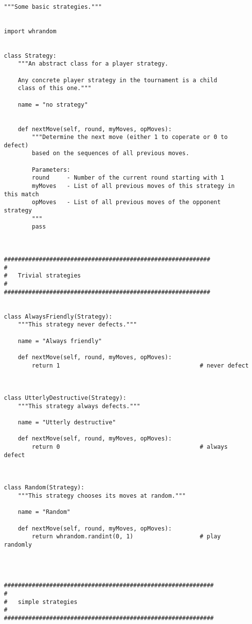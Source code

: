 \documentclass[12pt,a4paper,ngerman]{article}
\begin{document}
\begin{scriptsize}
\begin{verbatim}

"""Some basic strategies."""


import whrandom


class Strategy:
    """An abstract class for a player strategy.

    Any concrete player strategy in the tournament is a child
    class of this one."""

    name = "no strategy"


    def nextMove(self, round, myMoves, opMoves):
        """Determine the next move (either 1 to coperate or 0 to defect)
        based on the sequences of all previous moves.

        Parameters:
        round     - Number of the current round starting with 1
        myMoves   - List of all previous moves of this strategy in this match
        opMoves   - List of all previous moves of the opponent strategy
        """
        pass



###########################################################
#
#   Trivial strategies
#
###########################################################


class AlwaysFriendly(Strategy):
    """This strategy never defects."""

    name = "Always friendly"

    def nextMove(self, round, myMoves, opMoves):
        return 1                                        # never defect



class UtterlyDestructive(Strategy):
    """This strategy always defects."""

    name = "Utterly destructive"

    def nextMove(self, round, myMoves, opMoves):
        return 0                                        # always defect



class Random(Strategy):
    """This strategy chooses its moves at random."""

    name = "Random"

    def nextMove(self, round, myMoves, opMoves):
        return whrandom.randint(0, 1)                   # play randomly




############################################################
#
#   simple strategies
#
############################################################



\end{verbatim}
\end{scriptsize}
\end{document}
